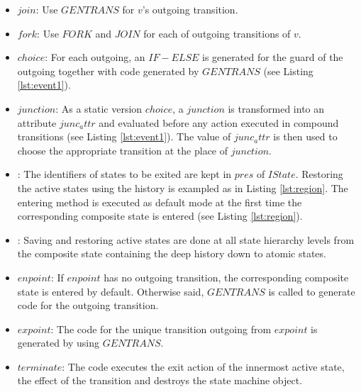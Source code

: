 \begin{itemize}
	\item $join$: Use $GENTRANS$ for $v$'s outgoing transition.
	
	\item $fork$: Use $FORK$ and $JOIN$ for each of outgoing transitions of $v$.
	
	\item $choice$: For each outgoing, an $IF-ELSE$ is generated for the guard of the outgoing together with code generated by $GENTRANS$ (see Listing \ref{lst:event1}).
	
	\item $junction$: As a static version $choice$, a $junction$ is transformed into an attribute $junc_attr$ and evaluated before any action executed in compound transitions (see Listing \ref{lst:event1}). 
	The value of $junc_attr$ is then used to choose the appropriate transition at the place of $junction$.
	
	\item {}: The identifiers of states to be exited are kept in $pres$ of $IState$. Restoring the active states using the history is exampled as in Listing \ref{lst:region}. The entering method is executed as default mode at the first time the corresponding composite state is entered (see Listing \ref{lst:region}).
	
	\item {}: Saving and restoring active states are done at all state hierarchy levels from the composite state containing the deep history down to atomic states.
	
	\item $enpoint$: If $enpoint$ has no outgoing transition, the corresponding composite state is entered by default. Otherwise said, $GENTRANS$ is called to generate code for the outgoing transition.
	
	\item $expoint$: The code for the unique transition outgoing from $expoint$ is generated by using $GENTRANS$.
	
	\item $terminate$: The code executes the exit action of the innermost active state, the effect of the transition and destroys the state machine object.
\end{itemize}

